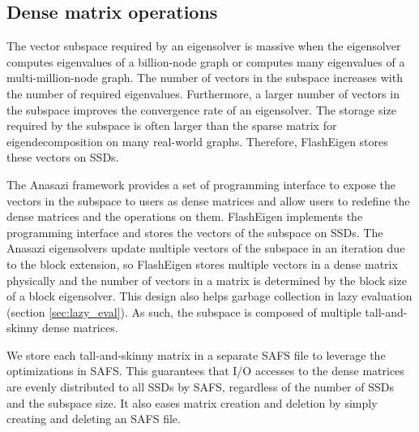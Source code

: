 \subsection{Dense matrix operations}
The vector subspace required by an eigensolver is massive when the eigensolver
computes eigenvalues of a billion-node graph or computes many eigenvalues
of a multi-million-node graph. The number of vectors in the subspace
increases with the number of required eigenvalues. Furthermore, a larger
number of vectors in the subspace improves the convergence rate of an eigensolver. 
The storage size required by the subspace is often larger than
the sparse matrix for eigendecomposition on many real-world graphs. Therefore,
FlashEigen stores these vectors on SSDs.

The Anasazi framework provides a set of programming interface to expose
the vectors in the subspace to users as dense matrices and allow users to
redefine the dense matrices and the operations on them. FlashEigen implements
the programming interface and stores the vectors of the subspace on SSDs.
The Anasazi eigensolvers update multiple vectors of the subspace in an iteration
due to the block extension, so FlashEigen stores multiple vectors in a dense
matrix physically and the number of vectors in a matrix is determined by
the block size of a block eigensolver. This design also helps garbage
collection in lazy evaluation (section \ref{sec:lazy_eval}).
As such, the subspace is composed of multiple tall-and-skinny dense matrices.

We store each tall-and-skinny matrix in a separate SAFS file to leverage
the optimizations in SAFS. This guarantees that I/O accesses to the dense
matrices are evenly distributed to all SSDs by SAFS, regardless of the number of
SSDs and the subspace size. It also eases matrix creation and deletion by
simply creating and deleting an SAFS file.

